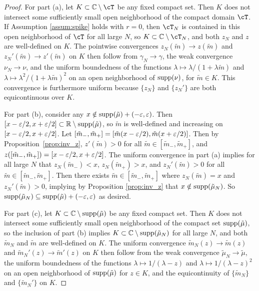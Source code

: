 \begin{proof}
For part (a), let $K \subset \C \setminus \cT$ be any fixed compact set.
Then $K$ does not intersect some sufficiently small open neighborhood of the compact
domain $\cT$. If Assumption \ref{assum:spike} holds with $r=0$, then $\cT_N$ is
contained in this open neighborhood of $\cT$ for all large $N$, so $K
\subset \C \setminus \cT_N$, and both $z_N$ and
$z$ are well-defined on $K$. The pointwise convergences $z_N(\tilde m) \to z(\tilde
m)$ and $z_N'(\tilde m) \to z'(\tilde m)$ on $K$ then follow from $\gamma_N \to
\gamma$, the weak convergence $\nu_N \to \nu$, and the uniform boundedness of the
functions $\lambda \mapsto \lambda/(1+\lambda \tilde m)$
and $\lambda \mapsto \lambda^2/(1+\lambda \tilde m)^2$ on an open
neighborhood of $\mathrm{supp}({\nu})$, for $\tilde m \in K$. This convergence is
furthermore uniform because $\{z_N\}$ and $\{z_N'\}$ are both equicontinuous
over $K$.

For part (b), consider any $x \notin \mathrm{supp}({\tilde \mu})+(-\varepsilon,\varepsilon)$.
Then $[x-\varepsilon/2,x+\varepsilon/2] \subset \mathbb{R} \setminus \mathrm{supp}({\tilde \mu})$, so $\tilde m$ is
well-defined and increasing on $[x-\varepsilon/2,x+\varepsilon/2]$. Let $[\tilde m_-,\tilde m_+]
=[\tilde m(x-\varepsilon/2),\tilde m(x+\varepsilon/2)]$. Then by Proposition~\ref{prop:inv_z},
$z'(\tilde m)>0$ for all $\tilde m \in [\tilde m_-,\tilde m_+]$, and
$z([\tilde m_-,\tilde m_+])=[x-\varepsilon/2,x+\varepsilon/2]$. The uniform convergence in
part (a) implies for all large $N$ that $z_N(\tilde m_-)<x$,
$z_N(\tilde m_+)>x$, and $z_N'(\tilde m)>0$ for all $\tilde m \in [\tilde
m_-,\tilde m_+]$. Then there exists $\tilde m \in [\tilde m_-,\tilde m_+]$
where $z_N(\tilde m)=x$ and $z_N'(\tilde m)>0$, implying by
Proposition \ref{prop:inv_z} that $x \notin \mathrm{supp}({\tilde \mu_N})$. So
$\mathrm{supp}({\tilde \mu_N}) \subseteq \mathrm{supp}({\tilde \mu})+(-\varepsilon,\varepsilon)$ as desired.

For part (c), let $K \subset \mathbb{C} \setminus \mathrm{supp}({\tilde \mu})$ be any
fixed compact set. Then $K$ does not intersect some sufficiently small open
neighborhood of the compact set $\mathrm{supp}({\tilde \mu})$, so the inclusion of part
(b) implies $K \subset \mathbb{C} \setminus \mathrm{supp}({\tilde \mu_N})$ for all large $N$, and
both $\tilde m_N$ and $\tilde m$ are well-defined on $K$. The
uniform convergence $\tilde m_N(z) \to \tilde m(z)$ and $\tilde m_N'(z) \to
\tilde m'(z)$ on $K$ then follow from the weak convergence $\tilde \mu_N \to
\tilde \mu$, the uniform boundedness of the functions $\lambda \mapsto
1/(\lambda-z)$ and $\lambda \mapsto 1/(\lambda-z)^2$ on an open neighborhood of
$\mathrm{supp}({\tilde \mu})$ for $z \in K$,
and the equicontinuity of $\{\tilde m_N\}$ and $\{\tilde m_N'\}$ on $K$.
\end{proof}

